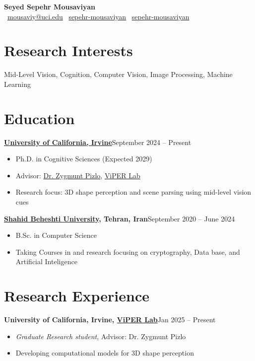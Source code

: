 \documentclass[a4paper,10pt]{article}
\begin{document}
\pagestyle{empty}

\begin{center}
  \textbf{\LARGE Seyed Sepehr Mousaviyan} \\
  \vspace{0.2em}
  \small
  \faEnvelope~\href{mailto:mousaviy@uci.edu}{mousaviy@uci.edu} \quad
  \faGithub~\href{https://github.com/sepehr-mousaviyan}{sepehr-mousaviyan} \quad
  \faLinkedin~\href{https://linkedin.com/in/sepehr-mousaviyan}{sepehr-mousaviyan}
\end{center}

\section*{Research Interests}
Mid-Level Vision, Cognition, Computer Vision, Image Processing, Machine Learning

\section*{Education}
\textbf{\href{https://www.uci.edu/}{University of California, Irvine}}\hfill September 2024 -- Present
\vspace{-0.5em}
\begin{itemize}
  \item Ph.D. in Cognitive Sciences (Expected 2029)
  \item Advisor: \href{https://www.cogsci.uci.edu/people/pizlo/}{Dr. Zygmunt Pizlo}, \href{https://www.viperlab.net/}{ViPER Lab}
  \item Research focus: 3D shape perception and scene parsing using mid-level vision cues
\end{itemize}

\textbf{\href{https://en.sbu.ac.ir/}{Shahid Beheshti University}, Tehran, Iran}\hfill September 2020 -- June 2024
\vspace{-0.5em}
\begin{itemize}
  \item B.Sc. in Computer Science
  \item Taking Courses in and research focusing on cryptography, Data base, and Artificial Inteligence
\end{itemize}

\section*{Research Experience}
\textbf{University of California, Irvine, \href{https://www.viperlab.net/}{ViPER Lab}}\hfill Jan 2025 -- Present
\vspace{-0.5em}
\begin{itemize}
  \item \textit{Graduate Research student}, Advisor: Dr. Zygmunt Pizlo
  \item Developing computational models for 3D shape perception 
\end{itemize}
\end{document}
